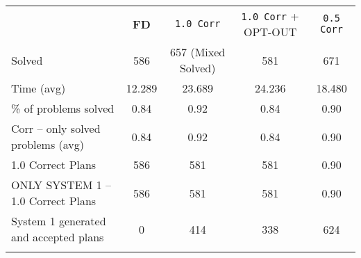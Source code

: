 \documentclass[12pt,a4paper]{standalone}
\begin{document}
	
	
	\begin{tabular}{||l|c|c|c|c||}
		\hhline{|t:=====:t|}
		& \footnotesize{\textbf{FD}}  & \texttt{1.0 Corr}   & \texttt{1.0 Corr} + OPT-OUT  & \texttt{0.5 Corr}                           \\
		\hhline{||-----||}
		Solved   & 586 & 657 (Mixed Solved)     & 581    & {671}       \\
		\hhline{||-----||}
		Time (avg)  & 12.289  & 23.689  & 24.236 & 18.480 \\
		\hhline{||-----||}
		\% of problems solved   & 0.84       & 0.92  & 0.84 & {0.90}     \\
		\hhline{||-----||}
		Corr -- only solved problems (avg)   & 0.84       & 0.92  & 0.84 & {0.90}     \\
				\hhline{||-----||}
		1.0 Correct Plans   & 586       & 581  & 581 & {0.90}     \\
				\hhline{||-----||}
		ONLY SYSTEM 1 -- 1.0 Correct Plans   & 586       & 581  & 581 & {0.90}     \\
		\hhline{||-----||}
		System 1 generated and accepted plans   & 0       & 414 & 338 & 624 \\
		\hhline{|b:=====:b|}
	\end{tabular}
	
\end{document}

